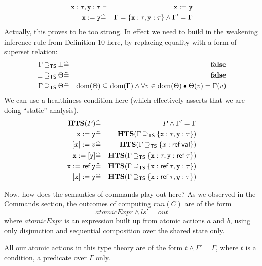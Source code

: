\begin{eqnarray*}
   \mathtt{x} : \tau, \mathtt{y} : \tau &\vdash& \mathtt{x} := \mathtt{y}
\\ \mathtt{x} := \mathtt{y} &\widehat=& \Gamma = \{\mathtt{x} : \tau, \mathtt{y} : \tau\} \land \Gamma'=\Gamma
\end{eqnarray*}
Actually, this proves to be too strong.
In effect we need to build in the weakening inference rule
from Definition 10 here, by replacing equality with a form of
superset relation:
\begin{eqnarray*}
   \Gamma \mathbin{\supseteq_{\mathsf{TS}}} \bot &\widehat=& \mathbf{false}
\\ \bot \mathbin{\supseteq_{\mathsf{TS}}} \Theta &\widehat=& \mathbf{false}
\\ \Gamma \mathbin{\supseteq_{\mathsf{TS}}} \Theta
   &\widehat=&
   \mathrm{dom}(\Theta)\subseteq \mathrm{dom}(\Gamma)
   \land
   \forall v \in \mathrm{dom}(\Theta) \bullet \Theta(v) = \Gamma(v)
\end{eqnarray*}
We can use a healthiness condition here
(which effectively asserts that we are doing ``static'' analysis).
\begin{eqnarray*}
  \mathbf{HTS}(P) &\widehat=& P \land \Gamma'=\Gamma
  \\ \mathtt{x} := \mathtt{y}     &\widehat=& \mathbf{HTS}(\Gamma \mathbin{\supseteq_{\mathsf{TS}}} \{\mathtt{x} : \tau, \mathtt{y} : \tau\})
\\ ~[x]:=v          &\widehat=& \mathbf{HTS}(\Gamma \mathbin{\supseteq_{\mathsf{TS}}} \{x: \mathop{\mathsf{ref}} \mathsf{val}\})
\\ \mathtt{x} := [\mathtt{y}]     &\widehat=& \mathbf{HTS}(\Gamma \mathbin{\supseteq_{\mathsf{TS}}} \{\mathtt{x}:\tau, \mathtt{y}:\mathop{\mathsf{ref}}\tau\})
\\ \mathtt{x} := \mathop{\mathsf{ref}} \mathtt{y} &\widehat=& \mathbf{HTS}(\Gamma \mathbin{\supseteq_{\mathsf{TS}}} \{\mathtt{x} : \mathop{\mathsf{ref}}\tau, \mathtt{y}:\tau\})
\\ ~[\mathtt{x}] := \mathtt{y}    &\widehat=& \mathbf{HTS}(\Gamma \mathbin{\supseteq_{\mathsf{TS}}} \{\mathtt{x} : \mathop{\mathsf{ref}}\tau, y:\tau\})
\end{eqnarray*}

Now, how does the semantics of commands play out here?
As we observed in the Commands section,
the outcomes of computing $run(C)$
are of the form
\[
  atomicExpr \land ls'=out
\]
where $atomicExpr$ is an expression built up from atomic actions
$a$ and $b$, using only disjunction and sequential composition
over the shared state only.

All our atomic actions in this type theory
are of the form $t \land \Gamma'=\Gamma$,
where $t$ is a condition, a predicate over $\Gamma$ only.

